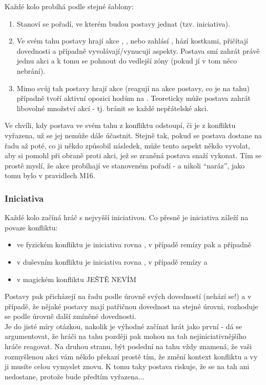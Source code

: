 \documentclass[../main.tex]{subfiles}
\begin{document}
Každé kolo probíhá podle stejné šablony:

\begin{enumerate}
\item Stanoví se pořadí, ve kterém budou postavy jednat (tzv. iniciativa).
\item Ve svém tahu postavy hrají akce , ,  nebo zahlásí , hází kostkami, přičítají dovednosti a případně vyvolávají/vynucují aspekty. Postava smí zahrát právě jednu akci a k tomu se pohnout do vedlejší zóny (pokud jí v tom něco nebrání).
\item Mimo svůj tah postavy hrají akce  (reagují na akce postavy, co je na tahu) případně tvoří aktivní opozici hodům na . Teoreticky může postava zahrát libovolné množství akcí  - tj. bránit se každé nepřátelské akci.
\end{enumerate}

Ve chvíli, kdy postava ve svém tahu z konfliktu odstoupí, či je z konfliktu vyřazena, už se jej nemůže dále účastnit. Stejně tak, pokud se postava dostane na řadu až poté, co ji někdo způsobil následek, může tento aspekt někdo vyvolat, aby si pomohl při obraně proti akci, jež se zraněná postava snaží vykonat. Tím se prostě myslí, že akce probíhají ve stanoveném pořadí - a nikoli ``naráz'', jako tomu bylo v pravidlech M16.

\subsubsection{Iniciativa}
\label{sec:iniciativa}

Každé kolo začíná hráč s nejvyšší iniciativou. Co přesně je iniciativa záleží na povaze konfliktu:

\begin{itemize}
\item ve fyzickém konfliktu je iniciativa rovna , v případě remízy pak  a případně 
\item v duševním konfliktu je iniciativa rovna , v případě remízy  a 
\item v magickém konfliktu JEŠTĚ NEVÍM
\end{itemize}

Postavy pak přicházejí na řadu podle úrovně svých dovedností (nehází se!) a v případě, že nějaké postavy mají patřičnou dovednost na stejné úrovni, rozhoduje se podle úrovně další zmíněné dovednosti.\\
Je do jisté míry otázkou, nakolik je výhodné začínat hrát jako první - dá se argumentovat, že hráči na tahu později pak mohou na tah nejiniciativnějšího hráče reagovat. Na druhou stranu, být poslední na tahu vždy znamená, že vaši rozmyšlenou akci vám někdo překazí prostě tím, že změní kontext konfliktu a vy ji musíte celou vymyslet znovu. K tomu taky postava riskuje, že se na tah ani nedostane, protože bude předtím vyřazena...
\end{document}
